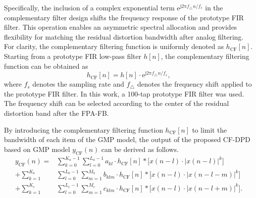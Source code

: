 \documentclass[twoside,twocolumn]{article}
\begin{document}
Specifically, the inclusion of a complex exponential term $\mathrm{e}^{\mathrm{j}2\mathrm{\pi} f_{\triangle} n/f_s}$ in the complementary filter design shifts the frequency response of the prototype FIR filter. This operation enables an asymmetric spectral allocation and provides flexibility for matching the residual distortion bandwidth after analog filtering. For clarity, the complementary filtering function is uniformly denoted as $h_{\mathrm{CF}}[n]$. Starting from a prototype FIR low-pass filter $h[n]$, the complementary filtering function can be obtained as
	\begin{equation}
		\label{eq_asym}
		h_{\mathrm{CF}}[n]=h[n]\cdot \mathrm{e}^{\mathrm{j}2\mathrm{\pi} f_{\triangle} n/f_s},
	\end{equation}
where $f_s$ denotes the sampling rate and $f_{\triangle}$ denotes the frequency shift applied to the prototype FIR filter. In this work, a 100-tap prototype FIR filter was used. The frequency shift can be selected according to the center of the residual distortion band after the FPA-FB.


By introducing the complementary filtering function $h_{\mathrm{CF}} [n]$ to limit the bandwidth of each item of the GMP model, the output of the proposed CF-DPD based on GMP model $y_{\mathrm{CF}}(n)$  can be derived as follows.
\begin{equation}
	\begin{aligned}
		y_{\mathrm{CF}}(n) = &\!\sum_{k=0}^{K_a-1} \sum_{l=0}^{L_a-1} a_{kl} \!\cdot\! h_{\mathrm{CF}} [n] \!*\! \big[x(n\!-\!l) \!\cdot\! |x(n\!-\!l)|^k \big] \\
		+   \!\sum_{k=1}^{K_b} & \sum_{l=0}^{L_b-1} \sum_{m=1}^{M_b}  b_{klm} \!\cdot\! h_{\mathrm{CF}}[n] \!*\! \big[x(n\!-\!l) \!\cdot\! |x(n\!-\!l\!-\!m)|^k \big] \\
		+  \!\sum_{k=1}^{K_c}  &  \sum_{l=0}^{L_c-1} \sum_{m=1}^{M_c} c_{klm} \!\cdot\! h_{\mathrm{CF}}[n] \!*\! \big[x(n\!-\!l) \!\cdot\! |x(n\!-\!l\!+\!m)|^k \big]. \\
	\end{aligned}
\end{equation}
\end{document}
